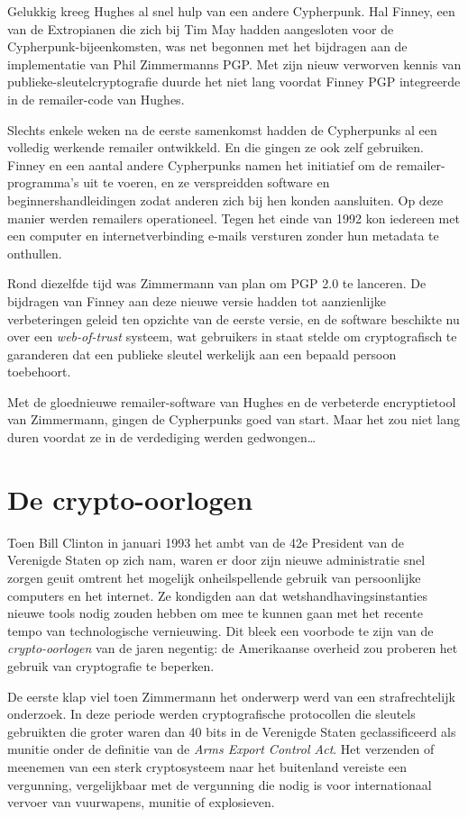 \documentclass[
  a5paper,
  smalldemyvopaper,11pt,twoside,onecolumn,openright,extrafontsizes,
hidelinks]{memoir}
\begin{document}
Gelukkig kreeg Hughes al snel hulp van een andere Cypherpunk. Hal
Finney, een van de Extropianen die zich bij Tim May hadden aangesloten
voor de Cypherpunk-bijeenkomsten, was net begonnen met het bijdragen aan
de implementatie van Phil Zimmermanns PGP. Met zijn nieuw verworven
kennis van publieke-sleutelcryptografie duurde het niet lang voordat
Finney PGP integreerde in de remailer-code van Hughes.

Slechts enkele weken na de eerste samenkomst hadden de Cypherpunks al
een volledig werkende remailer ontwikkeld. En die gingen ze ook zelf
gebruiken. Finney en een aantal andere Cypherpunks namen het initiatief
om de remailer-programma's uit te voeren, en ze verspreidden software en
beginnershandleidingen zodat anderen zich bij hen konden aansluiten. Op
deze manier werden remailers operationeel. Tegen het einde van 1992 kon
iedereen met een computer en internetverbinding e-mails versturen zonder
hun metadata te onthullen.

Rond diezelfde tijd was Zimmermann van plan om PGP 2.0 te lanceren. De
bijdragen van Finney aan deze nieuwe versie hadden tot aanzienlijke
verbeteringen geleid ten opzichte van de eerste versie, en de software
beschikte nu over een \emph{web-of-trust} systeem, wat gebruikers in
staat stelde om cryptografisch te garanderen dat een publieke sleutel
werkelijk aan een bepaald persoon toebehoort.

Met de gloednieuwe remailer-software van Hughes en de verbeterde
encryptietool van Zimmermann, gingen de Cypherpunks goed van start. Maar
het zou niet lang duren voordat ze in de verdediging werden
gedwongen\ldots{}

\section{De crypto-oorlogen}\label{de-crypto-oorlogen}

Toen Bill Clinton in januari 1993 het ambt van de 42e President van de
Verenigde Staten op zich nam, waren er door zijn nieuwe administratie
snel zorgen geuit omtrent het mogelijk onheilspellende gebruik van
persoonlijke computers en het internet. Ze kondigden aan dat
wetshandhavingsinstanties nieuwe tools nodig zouden hebben om mee te
kunnen gaan met het recente tempo van technologische vernieuwing. Dit
bleek een voorbode te zijn van de \emph{crypto-oorlogen} van de jaren
negentig: de Amerikaanse overheid zou proberen het gebruik van
cryptografie te beperken.

De eerste klap viel toen Zimmermann het onderwerp werd van een
strafrechtelijk onderzoek. In deze periode werden cryptografische
protocollen die sleutels gebruikten die groter waren dan 40 bits in de
Verenigde Staten geclassificeerd als munitie onder de definitie van de
\emph{Arms Export Control Act}. Het verzenden of meenemen van een sterk
cryptosysteem naar het buitenland vereiste een vergunning, vergelijkbaar
met de vergunning die nodig is voor internationaal vervoer van
vuurwapens, munitie of explosieven.
\end{document}
